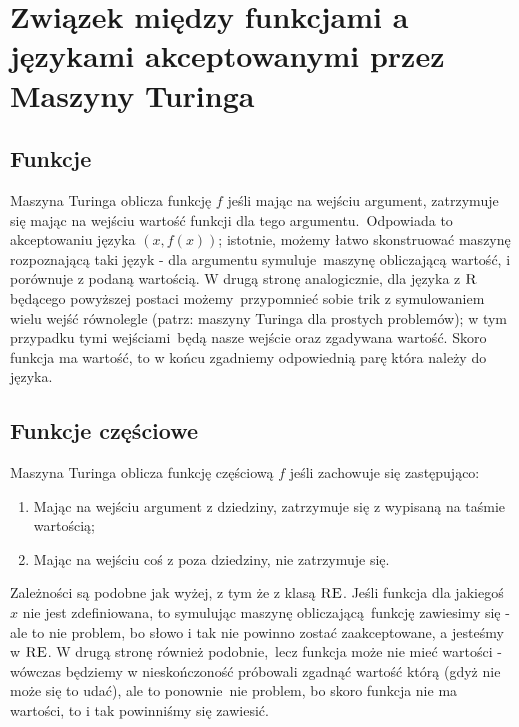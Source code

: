 \section{Związek między funkcjami a językami akceptowanymi przez Maszyny Turinga}

\subsection{Funkcje}

Maszyna Turinga oblicza funkcję \(f\) jeśli mając na wejściu argument, zatrzymuje się mając na wejściu wartość funkcji dla tego argumentu.\
Odpowiada to akceptowaniu języka \((x, f(x))\); istotnie, możemy łatwo skonstruować maszynę rozpoznającą taki język - dla argumentu symuluje\
maszynę obliczającą wartość, i porównuje z podaną wartością. W drugą stronę analogicznie, dla języka z \(\textsc{R}\) będącego powyższej postaci możemy\
przypomnieć sobie trik z symulowaniem wielu wejść równolegle (patrz: maszyny Turinga dla prostych problemów); w tym przypadku tymi wejściami\
będą nasze wejście oraz zgadywana wartość. Skoro funkcja ma wartość, to w końcu zgadniemy odpowiednią parę która należy do języka.

\subsection{Funkcje częściowe}

Maszyna Turinga oblicza funkcję częściową \(f\) jeśli zachowuje się zastępująco:

\begin{enumerate}
	\item Mając na wejściu argument z dziedziny, zatrzymuje się z wypisaną na taśmie wartością;
	\item Mając na wejściu coś z poza dziedziny, nie zatrzymuje się.
\end{enumerate}

Zależności są podobne jak wyżej, z tym że z klasą \(\textsc{RE}\). Jeśli funkcja dla jakiegoś \(x\) nie jest zdefiniowana, to symulując maszynę obliczającą\
funkcję zawiesimy się - ale to nie problem, bo słowo i tak nie powinno zostać zaakceptowane, a jesteśmy w \(\textsc{RE}\). W drugą stronę również podobnie,\
lecz funkcja może nie mieć wartości - wówczas będziemy w nieskończoność próbowali zgadnąć wartość którą (gdyż nie może się to udać), ale to ponownie\
nie problem, bo skoro funkcja nie ma wartości, to i tak powinniśmy się zawiesić.